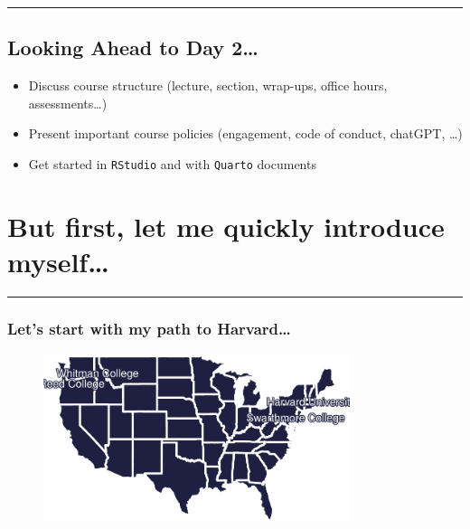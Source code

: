 \documentclass[
  letterpaper,
  DIV=11,
  numbers=noendperiod]{scrartcl}
\begin{document}
\begin{center}\rule{0.5\linewidth}{0.5pt}\end{center}

\hypertarget{looking-ahead-to-day-2}{%
\subsection{Looking Ahead to Day
2\ldots{}}\label{looking-ahead-to-day-2}}

\begin{itemize}
\item
  Discuss course structure (lecture, section, wrap-ups, office hours,
  assessments\ldots)
\item
  Present important course policies (engagement, code of conduct,
  chatGPT, \ldots)
\item
  Get started in \texttt{RStudio} and with \texttt{Quarto} documents
\end{itemize}

\hypertarget{but-first-let-me-quickly-introduce-myself}{%
\section{But first, let me quickly introduce
myself\ldots{}}\label{but-first-let-me-quickly-introduce-myself}}

\begin{center}\rule{0.5\linewidth}{0.5pt}\end{center}

\hypertarget{lets-start-with-my-path-to-harvard}{%
\subsubsection{Let's start with my path to
Harvard\ldots{}}\label{lets-start-with-my-path-to-harvard}}

\begin{figure}

{\centering \includegraphics[width=0.8\textwidth,height=\textheight]{stat100_wk01wed_files/figure-pdf/unnamed-chunk-2-1.pdf}

}

\end{figure}
\end{document}
